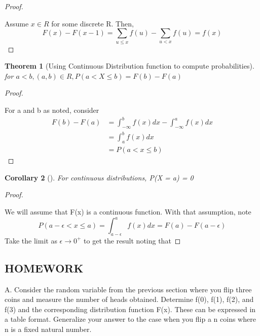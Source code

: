 \documentclass[10pt,]{book}
\theoremstyle{plain}
\newtheorem{theorem}{Theorem}[section]
\newtheorem{corollary}[theorem]{Corollary}
\theoremstyle{definition}
\theoremstyle{definition}
\theoremstyle{definition}
\numberwithin{equation}{section}
\newcommand{\lt}{ < }
\begin{document}
\begin{proof}\hypertarget{proof-26}{}
Assume \(x \in R\) for some discrete R. Then,
		\begin{equation*}F(x) - F(x-1) = \sum_{u \le x} f(u) - \sum_{u \lt x} f(u) = f(x)\end{equation*}
\end{proof}
\begin{theorem}[{Using Continuous Distribution function to compute probabilities}]\label{theorem-Fvsf-continuyous}
for \(a \lt b, (a,b) \in R, P(a \lt X \le b) = F(b) - F(a)\)\end{theorem}
\begin{proof}\hypertarget{proof-27}{}

		For a and b as noted, consider 
		\begin{align*}
F(b) - F(a) & = \int_{-\infty}^b f(x) dx - \int_{-\infty}^a f(x) dx\\
 & = \int_a^b f(x) dx \\
 & = P(a \lt x \le b)
\end{align*}
\end{proof}
\begin{corollary}[{}]\label{corollary-ProbPointZero-continuous}
For continuous distributions, P(X = a) = 0\end{corollary}
\begin{proof}\hypertarget{proof-28}{}

		We will assume that F(x) is a continuous function. With that assumption, note
		\begin{equation*}P(a-\epsilon \lt  x \le a)  = \int_{a-\epsilon}^a f(x) dx = F(a) - F(a-\epsilon)\end{equation*}
		Take the limit as \( \epsilon \rightarrow 0^+\) to get the result noting that
\end{proof}
\typeout{************************************************}
\typeout{************************************************}
\subsection[{HOMEWORK}]{HOMEWORK}\label{subsection-17}

	A.  Consider the random variable from the previous section where you flip three coins and measure the number of heads obtained. Determine f(0), f(1), f(2), and f(3) and the corresponding distribution function F(x). These can be expressed in a table format. Generalize your answer to the case when you flip a n coins where n is a fixed natural number.
\par
\end{document}
